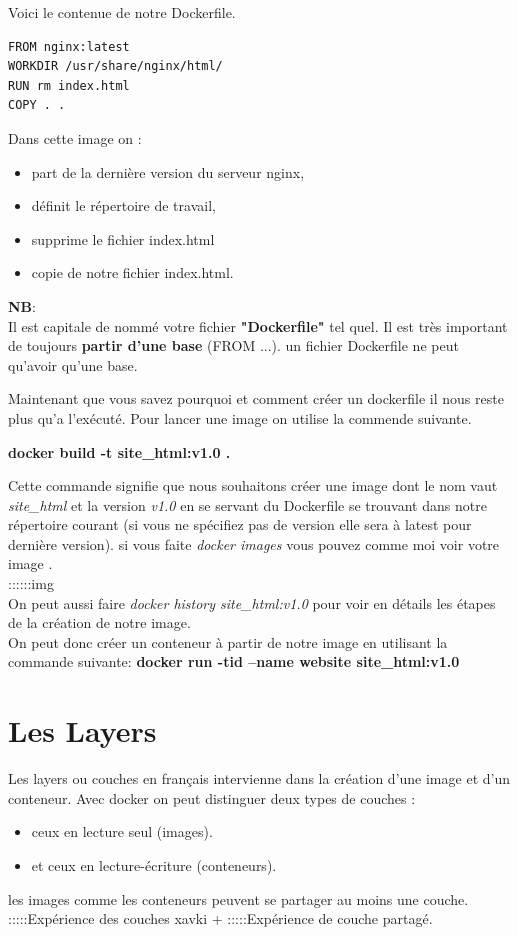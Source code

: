 \documentclass[12pt,a4paper]{article}
\begin{document}
Voici le contenue de notre Dockerfile.

\begin{verbatim}
FROM nginx:latest
WORKDIR /usr/share/nginx/html/
RUN rm index.html
COPY . .
\end{verbatim}

Dans cette image on :
\begin{itemize}
\item part de la dernière version du serveur nginx,
\item définit le répertoire de travail,
\item supprime le fichier index.html
\item copie de notre fichier index.html.
\end{itemize} 

\textbf{NB}: \\
Il est capitale de nommé votre fichier \textbf{"Dockerfile"} tel quel.
Il est très important de toujours \textbf{partir d'une base} (FROM ...).
un fichier Dockerfile ne peut qu'avoir qu'une base.

Maintenant que vous savez pourquoi et comment créer un dockerfile il nous reste plus
qu'a l'exécuté. Pour lancer une image on utilise la commende suivante.

\textbf{docker build -t site\_html:v1.0 .}

Cette commande signifie que nous souhaitons créer une image dont le nom vaut \textit{site\_html}
et la version \textit{v1.0} en se servant du Dockerfile se trouvant dans notre répertoire 
courant (si vous ne spécifiez pas de version elle sera à latest pour dernière version).
si vous faite \textit{docker images} vous pouvez comme moi voir votre image .\\
::::::img\\
On peut aussi faire \textit{docker history site\_html:v1.0} pour voir en détails les étapes de 
la création de notre image.\\

On peut donc créer un conteneur à partir de notre image en utilisant la commande suivante:
\textbf{docker run -tid --name website site\_html:v1.0}

\section{Les Layers}
Les layers ou couches en français intervienne dans la création d'une image et d'un conteneur. Avec docker on peut distinguer deux types de couches :
\begin{itemize}
\item ceux en lecture seul (images).
\item et ceux en lecture-écriture (conteneurs).
\end{itemize} 
les images comme les conteneurs peuvent se partager au moins une couche.
:::::Expérience des couches xavki +
:::::Expérience de couche partagé.
\end{document}

